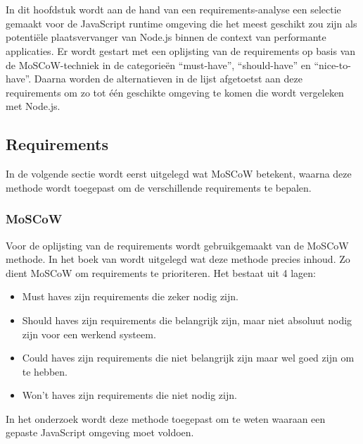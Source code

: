 
\chapter{}%
\label{ch:selectie}

In dit hoofdstuk wordt aan de hand van een requirements-analyse een selectie gemaakt voor de JavaScript runtime omgeving 
die het meest geschikt zou zijn als potentiële plaatsvervanger van Node.js binnen de context van performante applicaties.
Er wordt gestart met een oplijsting van de requirements op basis van de MoSCoW-techniek in de categorieën “must-have”, “should-have” en “nice-to-have”. 
Daarna worden de alternatieven in de lijst afgetoetst aan deze requirements om zo tot één geschikte omgeving te komen die wordt vergeleken met Node.js.

\section*{Requirements}
In de volgende sectie wordt eerst uitgelegd wat MoSCoW betekent, 
waarna deze methode wordt toegepast om de verschillende requirements te bepalen.
\subsection{MoSCoW}
Voor de oplijsting van de requirements wordt gebruikgemaakt van de MoSCoW methode. 
In het boek van \textcite{Vliet2007} wordt uitgelegd wat deze methode precies inhoud. 
Zo dient MoSCoW om requirements te prioriteren. Het bestaat uit 4 lagen:
\begin{itemize}
    \item Must haves zijn requirements die zeker nodig zijn.
    \item Should haves zijn requirements die belangrijk zijn, maar niet absoluut nodig zijn voor een werkend systeem.
    \item Could haves zijn requirements die niet belangrijk zijn maar wel goed zijn om te hebben.
    \item Won't haves zijn requirements die niet nodig zijn.
\end{itemize}
In het onderzoek wordt deze methode toegepast om te weten waaraan een gepaste JavaScript omgeving moet voldoen.

